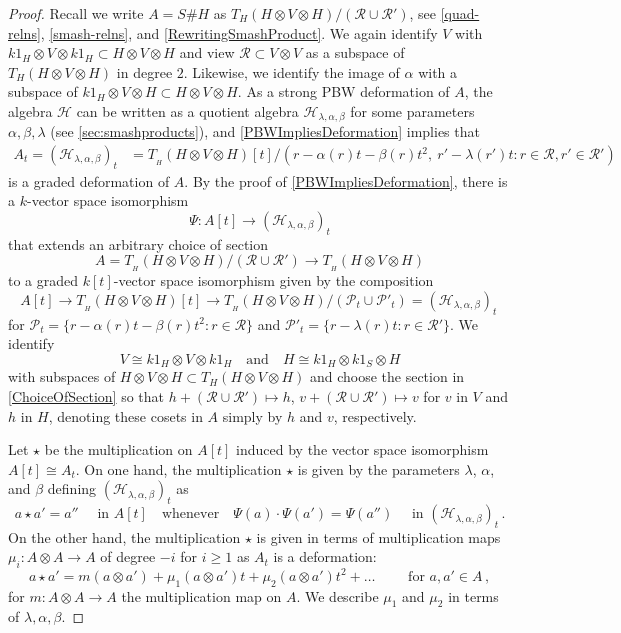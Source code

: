 \documentclass[11pt]{amsart}
\numberwithin{equation}{section}
\newcommand{\A}{A}%
\newcommand{\chabl}{\cH_{\lambda,\alpha,\beta}}
\newcommand{\sA}{A }
\newcommand{\R}{\mathcal{R}}
\renewcommand{\P}{\mathcal{P}}
\renewcommand{\_}[1]{\mbox{$_{\left( #1 \right)}$}}
\newcommand{\ot}{\otimes}
\newcommand{\cH}{\mathcal{H}}
\begin{document}
{\begin{proof}
  Recall we write $A=S\# H$ as $T_H(H\ot V\ot H)/(\R \cup \R')$, 
  see \cref{quad-relns}, \cref{smash-relns}, and \cref{RewritingSmashProduct}.
  We again identify $V$ with $k1_H\ot V \ot k1_H\subset H\ot V\ot H$
  and view $\R\subset V \ot V$ as a subspace of $T_H(H\ot V\ot H)$
  in degree $2$.  Likewise, we identify the image of $\alpha$
  with a subspace of $k1_H\ot V\ot H\subset H\ot V \ot H$.
  As a strong PBW deformation of $\A$,
  the algebra $\cH$ can be written as a quotient algebra $\chabl$ for some
   parameters $\alpha,\beta,\lambda$
  (see \cref{sec:smashproducts}), 
  and
  \cref{PBWImpliesDeformation} implies that
$$
\begin{aligned} 
\A_t=(\chabl)_t &=T_{\! _H}(H\ot V\ot H)[t]/( r- \alpha(r)t-\beta(r)t^2, \
r'-\lambda(r')t: r\in \R, r'\in \R')
\end{aligned}
$$
is a graded deformation of $\A$.
By the proof of \cref{PBWImpliesDeformation},
there is a $k$-vector space isomorphism
$$\Psi:\A[t]\longrightarrow (\chabl)_t$$
that extends an arbitrary choice of 
section
\begin{equation}
\A=T_{\! _H}(H\ot V\ot H)/(\R\cup \R') 
\longrightarrow T_{\! _H}(H\ot V \ot H)
\end{equation}
to a graded $k[t]$-vector space isomorphism
given by the composition 
$$
\A[t]\longrightarrow T_{\! _H}(H\ot V \ot H)[t]
\rightarrow T_{\! _H}(H\ot V\ot H)/(\P_t\cup \P'_t) =(\chabl)_t
\, 
$$
for $\P_t=\{r-\alpha(r)t-\beta(r)t^2: r\in \R\}$ and
$\P'_t=\{r-\lambda(r)t: r\in \R'\}$.
We identify $$V\cong k1_H\ot V \ot k1_H \quad\text{and}\quad H\cong k1_H\ot k1_S\ot H$$
with
subspaces of $H\ot V\ot H\subset T_H(H\ot V \ot H)$
and choose the section in \cref{ChoiceOfSection}
so that $h+(\R\cup \R') \mapsto h$,
$v+(\R\cup \R') \mapsto v$ for $v$ in $V$ and $h$ in $H$,
denoting these cosets in $A$ simply by $h$ and $v$, respectively.

Let $\star$ be the multiplication on $A[t]$
induced by the vector space isomorphism $A[t]\cong A_t$.
On one hand, the multiplication $\star$ is given by the
parameters $\lambda$, $\alpha$, and $\beta$
defining 
$(\chabl)_t$ as
$$a\star a'= a'' \quad\text{ in } A[t]
\quad\text{whenever}\quad 
\Psi(a) \cdot \Psi(a')=\Psi(a'')
\quad\text{ in }
(\chabl)_t
\, .
$$
On the other hand, 
the multiplication $\star$
is given in terms of multiplication maps $\mu_i:A\ot A\rightarrow A$ 
of degree $-i$
for $i\geq 1$ as $A_t$ is a deformation:
$$
a\star a' = m(a\ot a') +
\mu_1(a\ot a')t + \mu_2(a\ot a')t^2 + \ldots 
\qquad\text{ for } a,a'\in A \, , 
$$
for $m:A\ot A\rightarrow A$ the multiplication map on $A$.
We describe $\mu_1$ and $\mu_2$
in terms of $\lambda,\alpha,\beta$.


\end{proof}}
\end{document}
